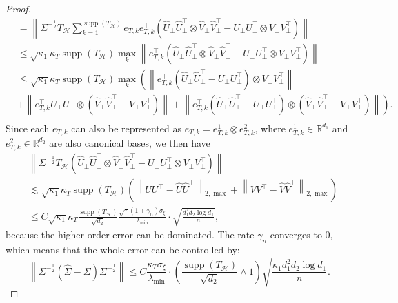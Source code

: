 \documentclass[12pt]{article}
\newcommand{\norm}[1]{\left\lVert#1\right\rVert}
\newcommand{\R}{\mathbb{R}}
\def\calH{{\mathcal H}}
\theoremstyle{plain}
\begin{document}
\begin{proof}
\begin{equation}
\begin{aligned}
          & = \norm{\Sigma^{-\frac{1}{2}}T_{\calH} \sum_{k=1}^{ \operatorname{supp}(T_{\calH} )  } e_{T, k}e_{T,k}^\top  \left(\widehat U_\perp \widehat U_\perp^\top \otimes \widehat V_\perp \widehat V_\perp^\top - U_\perp U_\perp^\top \otimes V_\perp V_\perp^\top\right)} \\
          & \le \sqrt{\kappa_1}\kappa_T \operatorname{supp}(T_{\calH} ) \max_{k}\norm{e_{T,k}^\top  \left(\widehat U_\perp \widehat U_\perp^\top \otimes \widehat V_\perp \widehat V_\perp^\top - U_\perp U_\perp^\top \otimes V_\perp V_\perp^\top\right)} \\
          & \le \sqrt{\kappa_1}\kappa_T\operatorname{supp}(T_{\calH} )  \max_{k} \left( \norm{e_{T,k}^\top  \left(\widehat U_\perp \widehat U_\perp^\top -U_\perp U_\perp^\top \right)\otimes V_\perp V_\perp^\top}\right. \\
          &  +\norm{e_{T,k}^\top  U_\perp U_\perp^\top \otimes \left( \widehat V_\perp \widehat V_\perp^\top-V_\perp V_\perp^\top\right) }+ \left.\norm{ e_{T,k}^\top \left(\widehat U_\perp \widehat U_\perp^\top -U_\perp U_\perp^\top \right)\otimes \left( \widehat V_\perp \widehat V_\perp^\top-V_\perp V_\perp^\top\right)}\right).\\
    \end{aligned}
\end{equation}
Since each $e_{T, k}$ can also be represented as $e_{T, k} = e_{T, k}^1 \otimes  e_{T, k}^2$, where $e_{T, k}^1\in\R^{d_1}$ and  $e_{T, k}^2\in\R^{d_2}$ are also canonical bases, we then have 
\begin{equation*}
    \begin{aligned}
      &\norm{\Sigma^{-\frac{1}{2}}T_{\calH}\left(\widehat U_\perp \widehat U_\perp^\top \otimes \widehat V_\perp \widehat V_\perp^\top - U_\perp U_\perp^\top \otimes V_\perp V_\perp^\top\right)} \\
          &  \lesssim \sqrt{\kappa_1}\kappa_T\operatorname{supp}(T_{\calH} )  \left(\norm{UU^\top-\widehat{U}\widehat{U}^\top }_{2,\max} + \norm{VV^\top-\widehat{V}\widehat{V}^\top }_{2,\max} \right)  \\
          & \le C \sqrt{\kappa_1}\kappa_T\frac{\operatorname{supp}(T_{\calH} )}{\sqrt{d_2}} \frac{\sqrt{\tau}\left(1+\gamma_{n}\right) \sigma_{\xi}}{\lambda_{\min}} \cdot \sqrt{\frac{d_1^2 d_2 \log d_1}{n}},
    \end{aligned}
\end{equation*}
because the higher-order error can be dominated.  The rate $\gamma_{n}$ converges to 0, which means that the whole error can be controlled by:
\begin{equation*}
   \norm{ \Sigma^{-\frac{1}{2}}(\widehat{\Sigma}-\Sigma)\Sigma^{-\frac{1}{2}}}\le C\frac{\kappa_T \sigma_\xi }{\lambda_{\min} } \cdot \left(\frac{\operatorname{supp}(T_{\calH} )}{\sqrt{d_2}}\wedge 1\right) \sqrt{\frac{ \kappa_1  d_1^2 d_2 \log d_1 }{n}}.
\end{equation*}
\end{proof}
\end{document}
